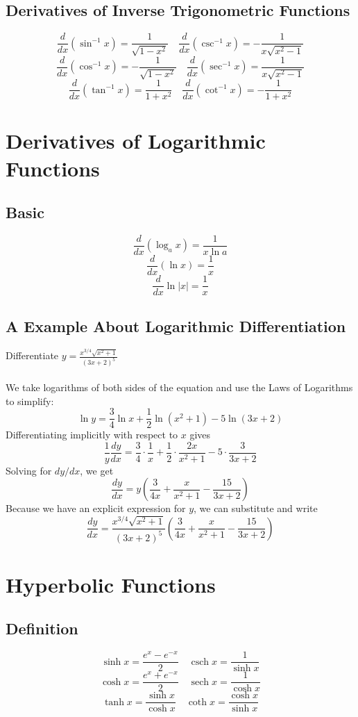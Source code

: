 \documentclass[10pt,a4paper,oneside]{article}
\begin{document}
\subsection{Derivatives of Inverse Trigonometric Functions}
\[
\frac{d}{dx}(\sin^{-1}x)=\frac{1}{\sqrt{1-x^2}}\quad\frac{d}{dx}(\csc^{-1}x)=-\frac{1}{x\sqrt{x^2-1}}
\]
\[
\frac{d}{dx}(\cos^{-1}x)=-\frac{1}{\sqrt{1-x^2}}\quad\frac{d}{dx}(\sec^{-1}x)=\frac{1}{x\sqrt{x^2-1}}
\]
\[
\frac{d}{dx}(\tan^{-1}x)=\frac{1}{1+x^2}\quad\frac{d}{dx}(\cot^{-1}x)=-\frac{1}{1+x^2}
\]
\section{Derivatives of Logarithmic Functions}
\subsection{Basic}
\[
\frac{d}{dx}(\log_ax)=\frac{1}{x\ln a}
\]
\[
\frac{d}{dx}(\ln x)=\frac{1}{x}
\]
\[
\frac{d}{dx}\ln|x|=\frac{1}{x}
\]
\subsection{A Example About Logarithmic Differentiation}
Differentiate $y=\frac{x^{3/4}\sqrt{x^2+1}}{(3x+2)^5}$\\
\\
We take logarithms of both sides of the equation and use the Laws of Logarithms to simplify:
\[
\ln y = \frac{3}{4}\ln x+\frac{1}{2}\ln(x^2+1)-5\ln(3x+2)
\]
Differentiating implicitly with respect to $x$ gives
\[
\frac{1}{y}\frac{dy}{dx}=\frac{3}{4}\cdot\frac{1}{x}+\frac{1}{2}\cdot\frac{2x}{x^2+1}-5\cdot\frac{3}{3x+2}
\]
Solving for $dy/dx$, we get
\[
\frac{dy}{dx}=y(\frac{3}{4x}+\frac{x}{x^2+1}-\frac{15}{3x+2})
\]
Because we have an explicit expression for $y$, we can substitute and write
\[
\frac{dy}{dx}=\frac{x^{3/4}\sqrt{x^2+1}}{(3x+2)^5}\left(\frac{3}{4x}+\frac{x}{x^2+1}-\frac{15}{3x+2}\right)
\]
\section{Hyperbolic Functions}
\subsection{Definition}
\[
\sinh x=\frac{e^x-e^{-x}}{2}\quad \operatorname{csch}x=\frac{1}{\sinh x}
\]
\[
\cosh x=\frac{e^x+e^{-x}}{2}\quad \operatorname{sech}x=\frac{1}{\cosh x}
\]
\[
\tanh x=\frac{\sinh x}{\cosh x}\quad \operatorname{coth}x=\frac{\cosh x}{\sinh x}
\]
\end{document}
